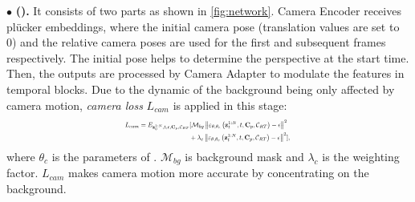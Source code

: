\noindent$\bullet$
\textbf{\camctrlcompletename (\camctrlname).} 
It consists of two parts as shown in \cref{fig:network}. 
Camera Encoder receives pl\"ucker embeddings, where the initial camera pose (translation values are set to 0) and the relative camera poses are used for the first and subsequent frames respectively. The initial pose helps to determine the perspective at the start time. Then, the outputs are processed by Camera Adapter to modulate the features in temporal blocks. Due to the dynamic of the background being only affected by camera motion, \textit{camera loss} $L_{cam}$ is applied in this stage:
\vspace{-0.6mm}\begin{equation}\vspace{-0.6mm}
\resizebox{0.432\textwidth}{!}{$
\begin{aligned}\label{eq:cam-ddpm-loss}
L_{cam}=E_{\mathbf{z}_0^{1:N},t,\epsilon,\mathbf{C}_p,\mathcal{C}_{RT}}&[\mathcal{M}_{bg}\left\|\varepsilon_{\theta,\theta_c}\left(\mathbf{z}^{1:N}_t, t, \mathbf{C}_p,\mathcal{C}_{RT}\right)-\epsilon\right\|^2 \\
&+ \lambda_c \left\|\varepsilon_{\theta,\theta_c}\left(\mathbf{z}^{1:N}_t, t, \mathbf{C}_p,\mathcal{C}_{RT}\right)-\epsilon\right\|^2 ],
\end{aligned}
$
}
\end{equation}
where $\theta_c$ is the parameters of \camctrlname. $\mathcal{M}_{bg}$ is background mask and $\lambda_c$ is the weighting factor. $L_{cam}$ makes camera motion more accurate by concentrating on the background. 



